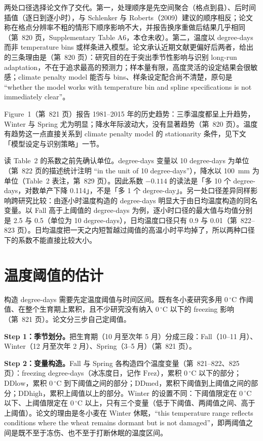两处口径选择论文作了交代。第一，处理顺序是先空间聚合（格点到县）、后时间插值（逐日到逐小时），与 Schlenker 与 Roberts（2009）建议的顺序相反；论文称在格点分辨率不粗的情形下顺序影响不大，并报告换序重做后结果几乎相同（第~820 页，Supplementary Table A6，本仓未收）。第二，温度以 degree-days 而非 temperature bins 或样条进入模型。论文承认近期文献更偏好后两者，给出的三条理由是（第~820 页）：研究目的在于突出季节性影响与识别 long-run adaptation，不在于追求最高的预测力；样本量有限，高度灵活的设定结果会很敏感；climate penalty model 能否与 bins、样条设定配合尚不清楚，原句是 ``whether the model works with temperature bin and spline specifications is not immediately clear''\citep[第~820 页]{da2024climate}。

Figure~1（第~821 页）报告 1981--2015 年的历史趋势：三季温度都呈上升趋势，Winter 与 Spring 尤为明显；降水年际波动大，没有显著趋势（第~820 页）。温度有趋势这一点直接关系到 climate penalty model 的 stationarity 条件，见下文「模型设定与识别策略」一节。

\begin{pitfall}
\label{pit:da-units}
读 Table~2 的系数之前先确认单位。degree-days 变量以 10 degree-days 为单位（第~822 页的描述统计注明 ``in the unit of 10 degree-days''\citep[第~822 页]{da2024climate}），降水以 100~mm 为单位（Table~2 表注，第~829 页）。因此系数 $-0.114$ 的读法是「多 10 个 degree-days，对数单产下降 0.114」，不是「多 1 个 degree-day」。另一处口径差异同样影响跨研究比较：由逐小时温度构造的 degree-days 明显大于由日均温度构造的同名变量。以 Fall 高于上阈值的 degree-days 为例，逐小时口径的最大值与均值分别是 2.5 与 0.5（单位为 10 degree-days），日均温度口径只有 0.9 与 0.01（第~822--823 页）。日均温度把一天之内短暂越过阈值的高温小时平均掉了，所以两种口径下的系数不能直接比较大小。
\end{pitfall}

\section{温度阈值的估计}

构造 degree-days 需要先定温度阈值与时间区间。既有冬小麦研究多用 0\,$^\circ$C 作阈值、在整个生育期上累积，且不少研究没有纳入 0\,$^\circ$C 以下的 freezing 影响（第~821 页）。论文分三步自己定阈值。

\textbf{Step 1：季节划分。}把生育期（10 月至次年 5 月）分成三段：Fall（10--11 月）、Winter（12 月至次年 2 月）、Spring（3--5 月）（第~821 页）。

\textbf{Step 2：变量构造。}Fall 与 Spring 各构造四个温度变量（第~821--822、825 页）：freezing degree-days（冰冻度日，记作 $\mathrm{Frez}$），累积 0\,$^\circ$C 以下的部分；$\mathrm{DDlow}$，累积 0\,$^\circ$C 到下阈值之间的部分；$\mathrm{DDmed}$，累积下阈值到上阈值之间的部分；$\mathrm{DDhigh}$，累积上阈值以上的部分。Winter 的设置不同：下阈值限定在 0\,$^\circ$C 以下、上阈值限定在 0\,$^\circ$C 以上，只有三个变量（低于下阈值、两阈值之间、高于上阈值）。论文的理由是冬小麦在 Winter 休眠，``this temperature range reflects conditions where the wheat remains dormant but is not damaged''\citep[第~822 页]{da2024climate}，即两阈值之间是既不至于冻伤、也不至于打断休眠的温度区间。

